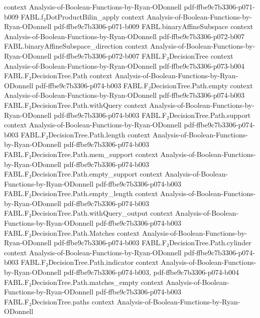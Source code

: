 \begin{theorem}
  {context}
  {Analysis-of-Boolean-Functions-by-Ryan-ODonnell}
  {pdf-ffbe9c7b3306-p071-b009}
\proofstep
  {FABL.f₂DotProductBilin_apply}
  {context}
  {Analysis-of-Boolean-Functions-by-Ryan-ODonnell}
  {pdf-ffbe9c7b3306-p071-b009}
\proofstep
  {FABL.binaryAffineSubspace}
  {context}
  {Analysis-of-Boolean-Functions-by-Ryan-ODonnell}
  {pdf-ffbe9c7b3306-p072-b007}
\proofstep
  {FABL.binaryAffineSubspace_direction}
  {context}
  {Analysis-of-Boolean-Functions-by-Ryan-ODonnell}
  {pdf-ffbe9c7b3306-p072-b007}
\proofstep
  {FABL.F₂DecisionTree}
  {context}
  {Analysis-of-Boolean-Functions-by-Ryan-ODonnell}
  {pdf-ffbe9c7b3306-p073-b004}
\proofstep
  {FABL.F₂DecisionTree.Path}
  {context}
  {Analysis-of-Boolean-Functions-by-Ryan-ODonnell}
  {pdf-ffbe9c7b3306-p074-b003}
\proofstep
  {FABL.F₂DecisionTree.Path.empty}
  {context}
  {Analysis-of-Boolean-Functions-by-Ryan-ODonnell}
  {pdf-ffbe9c7b3306-p074-b003}
\proofstep
  {FABL.F₂DecisionTree.Path.withQuery}
  {context}
  {Analysis-of-Boolean-Functions-by-Ryan-ODonnell}
  {pdf-ffbe9c7b3306-p074-b003}
\proofstep
  {FABL.F₂DecisionTree.Path.support}
  {context}
  {Analysis-of-Boolean-Functions-by-Ryan-ODonnell}
  {pdf-ffbe9c7b3306-p074-b003}
\proofstep
  {FABL.F₂DecisionTree.Path.length}
  {context}
  {Analysis-of-Boolean-Functions-by-Ryan-ODonnell}
  {pdf-ffbe9c7b3306-p074-b003}
\proofstep
  {FABL.F₂DecisionTree.Path.mem_support}
  {context}
  {Analysis-of-Boolean-Functions-by-Ryan-ODonnell}
  {pdf-ffbe9c7b3306-p074-b003}
\proofstep
  {FABL.F₂DecisionTree.Path.empty_support}
  {context}
  {Analysis-of-Boolean-Functions-by-Ryan-ODonnell}
  {pdf-ffbe9c7b3306-p074-b003}
\proofstep
  {FABL.F₂DecisionTree.Path.empty_length}
  {context}
  {Analysis-of-Boolean-Functions-by-Ryan-ODonnell}
  {pdf-ffbe9c7b3306-p074-b003}
\proofstep
  {FABL.F₂DecisionTree.Path.withQuery_output}
  {context}
  {Analysis-of-Boolean-Functions-by-Ryan-ODonnell}
  {pdf-ffbe9c7b3306-p074-b003}
\proofstep
  {FABL.F₂DecisionTree.Path.Matches}
  {context}
  {Analysis-of-Boolean-Functions-by-Ryan-ODonnell}
  {pdf-ffbe9c7b3306-p074-b003}
\proofstep
  {FABL.F₂DecisionTree.Path.cylinder}
  {context}
  {Analysis-of-Boolean-Functions-by-Ryan-ODonnell}
  {pdf-ffbe9c7b3306-p074-b003}
\proofstep
  {FABL.F₂DecisionTree.Path.indicator}
  {context}
  {Analysis-of-Boolean-Functions-by-Ryan-ODonnell}
  {pdf-ffbe9c7b3306-p074-b003,
    pdf-ffbe9c7b3306-p074-b004}
\proofstep
  {FABL.F₂DecisionTree.Path.matches_empty}
  {context}
  {Analysis-of-Boolean-Functions-by-Ryan-ODonnell}
  {pdf-ffbe9c7b3306-p074-b003}
\proofstep
  {FABL.F₂DecisionTree.paths}
  {context}
  {Analysis-of-Boolean-Functions-by-Ryan-ODonnell}

\end{theorem}
